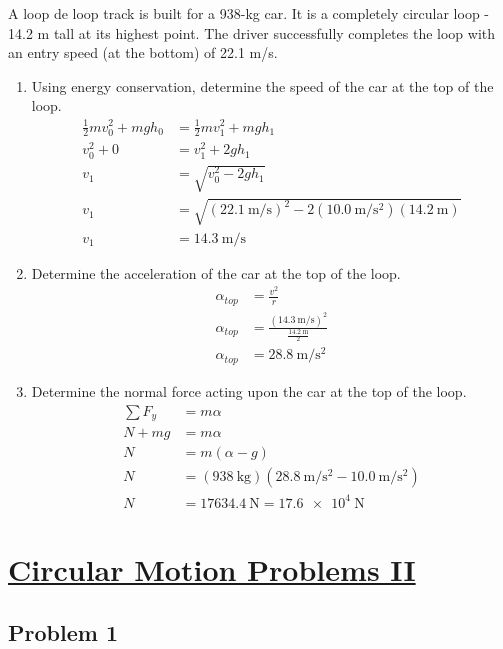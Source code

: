 \documentclass{article}
\begin{document}
A loop de loop track is built for a 938-kg car. It is a completely circular loop - 14.2 m tall at its highest point. The driver successfully completes the loop with an entry speed (at the bottom) of 22.1 m/s.
\begin{enumerate}[label = \textbf{\alph*.}]
	\item Using energy conservation, determine the speed of the car at the top of the loop.
		\begin{align*}
			\frac{1}{2}mv_0^2 + mgh_0 & = \frac{1}{2}mv_1^2 + mgh_1 \\
			v_0^2 + 0 & = v_1^2 + 2gh_1 \\
			v_1 & = \sqrt{ v_0^2 - 2gh_1 } \\
			v_1 & = \sqrt{ (\SI{22.1}{\meter \per \second})^2 - 2(\SI{10.0}{\meter \per \second \squared})(\SI{14.2}{\meter}) } \\
			v_1 & = \SI{14.3}{\meter \per \second}
		\end{align*}
	\item Determine the acceleration of the car at the top of the loop.
		\begin{align*}
			\alpha_{top} & = \frac{ v^2 }{ r } \\
			\alpha_{top} & = \frac{ (\SI{14.3}{\meter \per \second})^2 }{ \frac{ \SI{14.2}{\meter} }{ 2 } } \\
			\alpha_{top} & = \SI{28.8}{\meter \per \second \squared}
		\end{align*}
	\item Determine the normal force acting upon the car at the top of the loop.
		\begin{align*}
			\sum F_y & = m\alpha \\
			N + mg & = m\alpha \\
			N & = m(\alpha - g) \\
			N & = (\SI{938}{\kilogram})(\SI{28.8}{\meter \per \second \squared} - \SI{10.0}{\meter \per \second \squared}) \\
			N & = \SI{17634.4}{\newton} = \SI{17.6e4}{\newton}
		\end{align*}
\end{enumerate}

\section{
	\href{https://scienceres-edcp-educ.sites.olt.ubc.ca/files/2015/10/sec_phys_circularmotion_problems.pdf}{Circular Motion Problems II}
}

\subsection{Problem 1}
\end{document}
